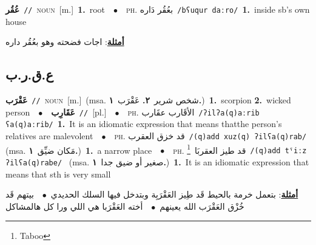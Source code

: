 \documentclass[10pt,a4paper,twoside]{article} %
\begin{document}
\begin{multicols}{2}
{\setlength\topsep{0pt}\textbf{\foreignlanguage{arabic}{عُقُر}}\ {\color{gray}\texttt{//}\color{black}}\ \textsc{noun}\ [m.]\ \textbf{1.}~root\ \ $\bullet$\ \ \textsc{ph.} \color{gray} \foreignlanguage{arabic}{بعُقُر دَاره}\color{black}\ {\color{gray}\texttt{/{\sffamily bʕuqur daːro}/}\color{black}}\ \textbf{1.}~inside sb's own house\  \begin{flushright}\color{gray}\foreignlanguage{arabic}{\textbf{\underline{\foreignlanguage{arabic}{أمثلة}}}: اجات فضحته وهو بعُقُر داره}\end{flushright}\color{black}} \vspace{2mm}

\vspace{-3mm}
\subsection*{\color{blue}\foreignlanguage{arabic}{ع.ق.ر.ب}\color{blue}{}} 

{\setlength\topsep{0pt}\textbf{\foreignlanguage{arabic}{عَقْرَب}}\ {\color{gray}\texttt{//}\color{black}}\ \textsc{noun}\ [m.]\ \color{gray}(msa. \foreignlanguage{arabic}{شخص شرير}~\foreignlanguage{arabic}{\textbf{٢.}}  \foreignlanguage{arabic}{عَقْرَب}~\foreignlanguage{arabic}{\textbf{١.}})\color{black}\ \textbf{1.}~scorpion  \textbf{2.}~wicked person\ \ $\bullet$\ \ \setlength\topsep{0pt}\textbf{\foreignlanguage{arabic}{عَقَارِب}}\ {\color{gray}\texttt{//}\color{black}}\ [pl.]\ \ $\bullet$\ \ \textsc{ph.} \color{gray} \foreignlanguage{arabic}{الأقَارب عقَارب}\color{black}\ {\color{gray}\texttt{/{\sffamily ʔilʔa(q)aːrib ʕa(q)aːrib}/}\color{black}}\ \textbf{1.}~It is an idiomatic expression that means thatthe person's relatives are malevolent\ \ $\bullet$\ \ \textsc{ph.} \color{gray} \foreignlanguage{arabic}{قد خزق العقرب}\color{black}\ {\color{gray}\texttt{/{\sffamily (q)add xuz(q) ʔilʕa(q)rab}/}\color{black}}\ \color{gray} (msa. \foreignlanguage{arabic}{مَكان ضيِّق}~\foreignlanguage{arabic}{\textbf{١.}})\color{black}\ \textbf{1.}~a narrow place\ \ $\bullet$\ \ \textsc{ph.} \color{gray} \foreignlanguage{arabic}{قد طيز العقربَا}\color{black}\ \footnote{Taboo}\ {\color{gray}\texttt{/{\sffamily (q)add tˤiːz ʔilʕa(q)rabe}/}\color{black}}\ \color{gray} (msa. \foreignlanguage{arabic}{صغير أو ضيق جدا}~\foreignlanguage{arabic}{\textbf{١.}})\color{black}\ \textbf{1.}~It is an idiomatic expression that means that sth is very small\  \begin{flushright}\color{gray}\foreignlanguage{arabic}{\textbf{\underline{\foreignlanguage{arabic}{أمثلة}}}: بتعمل خرمة بالحيط قَد طِيز العَقْرَبِة وبتدخل فيها السلك الحديدي\ $\bullet$\ \  بيتهم قَد خُزْق العَقْرَب الله يعينهم\ $\bullet$\ \  أخته العَقْرَبا هي اللي ورا كل هالمشاكل}\end{flushright}\color{black}} \vspace{2mm}


\end{multicols}
\end{document}

